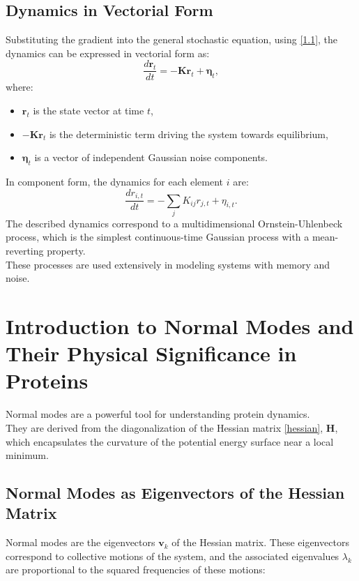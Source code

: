 \documentclass[English, Lau, oneside]{sapthesis}
\begin{document}
\subsection{Dynamics in Vectorial Form}
Substituting the gradient into the general stochastic equation, using \eqref{1.1}, the dynamics can be expressed in vectorial form as:
\begin{equation}
\frac{d\mathbf{r}_t}{dt} = -\mathbf{K} \mathbf{r}_t + \boldsymbol{\eta}_t,
\end{equation}
where:
\begin{itemize}
    \item \( \mathbf{r}_t \) is the state vector at time \( t \),
    \item \( -\mathbf{K} \mathbf{r}_t \) is the deterministic term driving the system towards equilibrium,
    \item \( \boldsymbol{\eta}_t \) is a vector of independent Gaussian noise components.
\end{itemize}

In component form, the dynamics for each element \( i \) are:
\begin{equation}
    \frac{d r_{i,t}}{dt} = -\sum_j K_{ij} r_{j,t} + \eta_{i,t}.
\end{equation}
The described dynamics correspond to a multidimensional Ornstein-Uhlenbeck process, which is the simplest continuous-time Gaussian process with a mean-reverting property.\\
These processes are used extensively in modeling systems with memory and noise.\\

\newpage
\section{Introduction to Normal Modes and Their Physical Significance in Proteins}

Normal modes are a powerful tool for understanding protein dynamics. \\
They are derived from the diagonalization of the Hessian matrix \eqref{hessian}, \( \mathbf{H} \), which encapsulates the curvature of the potential energy surface near a local minimum. 

\subsection{Normal Modes as Eigenvectors of the Hessian Matrix}

Normal modes are the eigenvectors \( \mathbf{v}_k \) of the Hessian matrix. These eigenvectors correspond to collective motions of the system, and the associated eigenvalues \( \lambda_k \) are proportional to the squared frequencies of these motions:
\end{document}

